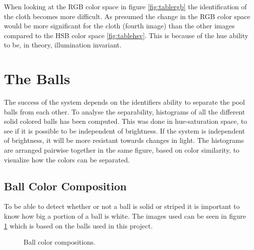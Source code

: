 When looking at the RGB color space in figure \ref{fig:tablergb} the identification of the cloth becomes more difficult. As presumed the change in the RGB color space would be more significant for the cloth (fourth image) than the other images compared to the HSB color space \ref{fig:tablehsv}. This is because of the hue ability to be, in theory, illumination invariant.

\section{The Balls}
\label{sec:analballs}
The success of the system depends on the identifiers ability to separate the pool balls from each other. To analyse the separability, histograms of all the different solid colored balls has been computed. This was done in hue-saturation space, to see if it is possible to be independent of brightness. If the system is independent of brightness, it will be more resistant towards changes in light. The histograms are arranged pairwise together in the same figure, based on color similarity, to visualize how the colors can be separated.



\subsection{Ball Color Composition}
To be able to detect whether or not a ball is solid or striped it is important to know how big a portion of a ball is white. The images used can be seen in figure \ref{fig:ballscompo} which is based on the balls used in this project.

\begin{figure}[htb]
\centering
{}
\quad
{}
\quad
{}

\caption{Ball color compositions.}
\label{fig:ballscompo}
\end{figure}

